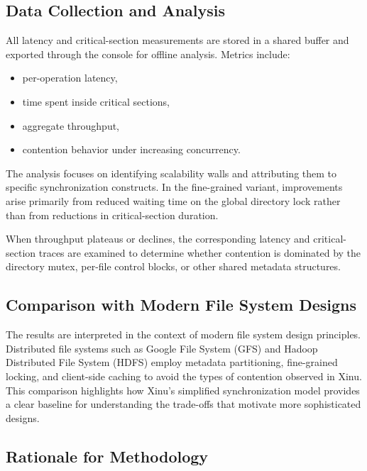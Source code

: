 \documentclass[sigconf]{acmart}
\begin{document}
\subsection{Data Collection and Analysis}

All latency and critical-section measurements are stored in a shared buffer and exported through the console for offline analysis. Metrics include:

\begin{itemize}
    \item per-operation latency,
    \item time spent inside critical sections,
    \item aggregate throughput,
    \item contention behavior under increasing concurrency.
\end{itemize}

The analysis focuses on identifying scalability walls and attributing them to specific synchronization constructs. In the fine-grained variant, improvements arise primarily from reduced waiting time on the global directory lock rather than from reductions in critical-section duration.

When throughput plateaus or declines, the corresponding latency and critical-section traces are examined to determine whether contention is dominated by the directory mutex, per-file control blocks, or other shared metadata structures.




\subsection{Comparison with Modern File System Designs}

The results are interpreted in the context of modern file system design principles. Distributed file systems such as Google File System (GFS)\cite{Okutubo2020GoogleFS, Ghemawat2003TheGF} and Hadoop Distributed File System (HDFS)\cite{Shvachko2010TheHD} employ metadata partitioning, fine-grained locking, and client-side caching to avoid the types of contention observed in Xinu. This comparison highlights how Xinu’s simplified synchronization model provides a clear baseline for understanding the trade-offs that motivate more sophisticated designs.


\subsection{Rationale for Methodology}
\end{document}

